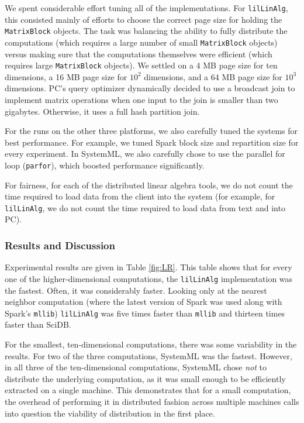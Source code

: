 We spent considerable effort tuning all of the implementations.
For \texttt{lilLinAlg}, this consisted mainly of efforts to choose the correct page size for holding the
\texttt{MatrixBlock} objects.  The task was balancing the ability to fully distribute the computations
(which requires a large number of small \texttt{MatrixBlock} objects) versus making sure that the computations
themselves were efficient (which requires large \texttt{MatrixBlock} objects).  We settled on 
a 4 MB page size for ten dimensions, a 16 MB page
size for $10^2$ dimensions, and a 64 MB page size for $10^3$ dimensions. 
PC's query optimizer dynamically decided to use a
broadcast join to implement matrix operations when one input to the join is smaller than 
two
gigabytes.  Otherwise, it uses a full hash partition join.

For the runs on the other three platforms, we also carefully tuned the
systems for best performance. For example, we tuned Spark block size and repartition
size for every experiment. In SystemML, we also carefully chose to
use the parallel for loop (\texttt{parfor}), which boosted performance significantly.

For fairness, for each of the distributed linear algebra tools, 
we do not count the time required to load data from the client into the system
(for example, 
for \texttt{lilLinAlg}, we do not count the time required to load data from text and into PC).

\subsubsection {Results and Discussion}

Experimental results are given in 
Table \ref{fig:LR}. 
This table shows that for every one of the higher-dimensional computations, the 
\texttt{lilLinAlg} implementation was the fastest.  Often, it was considerably faster.
Looking only at the nearest neighbor computation (where the latest version of Spark was used
along with Spark's \texttt{mllib}) \texttt{lilLinAlg} was five times faster than \texttt{mllib}
and thirteen times faster than SciDB.  

For the smallest, ten-dimensional computations, there was some variability in the results.
For two of the three computations, 
SystemML was the fastest.  However, in all three of the ten-dimensional computations, SystemML chose
\emph{not} to distribute the underlying computation, as it was small enough to be efficiently extracted
on a single machine.  This demonstrates that for a small computation, the overhead of performing it in 
distributed fashion across multiple machines calls into question the viability of distribution in the first place.

